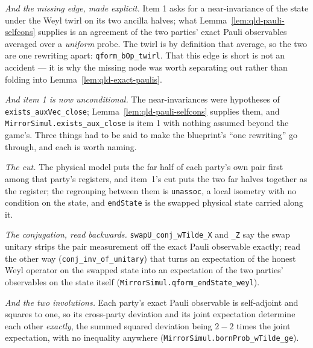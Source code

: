 \emph{And the missing edge, made explicit.} Item 1 asks for a near-invariance of the state under
the Weyl twirl on its two ancilla halves; what Lemma~\ref{lem:qld-pauli-selfcons} supplies is an
agreement of the two parties' exact Pauli observables averaged over a \emph{uniform} probe. The
twirl is by definition that average, so the two are one rewriting apart:
\texttt{qform\_bOp\_twirl}. That this edge is short is not an accident --- it is why the missing
node was worth separating out rather than folding into
Lemma~\ref{lem:qld-exact-paulis}.

\emph{And item 1 is now unconditional.} The near-invariances were hypotheses of
\texttt{exists\_auxVec\_close}; Lemma~\ref{lem:qld-pauli-selfcons} supplies them, and
\texttt{MirrorSimul.exists\_aux\_close} is item 1 with nothing assumed beyond the game's.
Three things had to be said to make the blueprint's ``one rewriting'' go through, and each is
worth naming.

\emph{The cut.} The physical model puts the far half of each party's own pair first among that
party's registers, and item~1's cut puts the two far halves together as the register; the
regrouping between them is \texttt{unassoc}, a local isometry with no condition on the state, and
\texttt{endState} is the swapped physical state carried along it.

\emph{The conjugation, read backwards.} \texttt{swapU\_conj\_wTilde\_X} and \texttt{\_Z} say
the swap unitary strips the pair measurement off the exact Pauli observable exactly; read the
other way (\texttt{conj\_inv\_of\_unitary}) that turns an expectation of the honest Weyl operator
on the swapped state into an expectation of the two parties' observables on the state itself
(\texttt{MirrorSimul.qform\_endState\_weyl}).

\emph{And the two involutions.} Each party's exact Pauli observable is self-adjoint and squares
to one, so its cross-party deviation and its joint expectation determine each other
\emph{exactly}, the summed squared deviation being $2 - 2$ times the joint expectation, with no
inequality anywhere
(\texttt{MirrorSimul.bornProb\_wTilde\_ge}).

